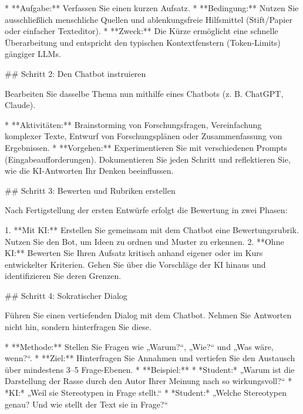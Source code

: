 \documentclass[
  ngerman,
  letterpaper,
  DIV=11]{scrreprt}
\newenvironment{Shaded}{\begin{snugshade}}{\end{snugshade}}
\newcommand{\FunctionTok}[1]{\textcolor[rgb]{0.28,0.35,0.67}{#1}}
\newcommand{\NormalTok}[1]{\textcolor[rgb]{0.00,0.23,0.31}{#1}}
\newcommand{\SpecialStringTok}[1]{\textcolor[rgb]{0.13,0.47,0.30}{#1}}
\begin{document}
\begin{tcolorbox}
\begin{Shaded}
\begin{Highlighting}[]
\SpecialStringTok{* }\NormalTok{**Aufgabe:** Verfassen Sie einen kurzen Aufsatz.}
\SpecialStringTok{* }\NormalTok{**Bedingung:** Nutzen Sie ausschließlich menschliche Quellen und ablenkungsfreie Hilfsmittel (Stift/Papier oder einfacher Texteditor).}
\SpecialStringTok{* }\NormalTok{**Zweck:** Die Kürze ermöglicht eine schnelle Überarbeitung und entspricht den typischen Kontextfenstern (Token{-}Limits) gängiger LLMs.}

\FunctionTok{\#\# Schritt 2: Den Chatbot instruieren}

\NormalTok{Bearbeiten Sie dasselbe Thema nun mithilfe eines Chatbots (z. B. ChatGPT, Claude).}

\SpecialStringTok{* }\NormalTok{**Aktivitäten:** Brainstorming von Forschungsfragen, Vereinfachung komplexer Texte, Entwurf von Forschungsplänen oder Zusammenfassung von Ergebnissen.}
\SpecialStringTok{* }\NormalTok{**Vorgehen:** Experimentieren Sie mit verschiedenen Prompts (Eingabeaufforderungen). Dokumentieren Sie jeden Schritt und reflektieren Sie, wie die KI{-}Antworten Ihr Denken beeinflussen.}

\FunctionTok{\#\# Schritt 3: Bewerten und Rubriken erstellen}

\NormalTok{Nach Fertigstellung der ersten Entwürfe erfolgt die Bewertung in zwei Phasen:}

\SpecialStringTok{1.  }\NormalTok{**Mit KI:** Erstellen Sie gemeinsam mit dem Chatbot eine Bewertungsrubrik. Nutzen Sie den Bot, um Ideen zu ordnen und Muster zu erkennen.}
\SpecialStringTok{2.  }\NormalTok{**Ohne KI:** Bewerten Sie Ihren Aufsatz kritisch anhand eigener oder im Kurs entwickelter Kriterien. Gehen Sie über die Vorschläge der KI hinaus und identifizieren Sie deren Grenzen.}

\FunctionTok{\#\# Schritt 4: Sokratischer Dialog}

\NormalTok{Führen Sie einen vertiefenden Dialog mit dem Chatbot. Nehmen Sie Antworten nicht hin, sondern hinterfragen Sie diese.}

\SpecialStringTok{* }\NormalTok{**Methode:** Stellen Sie Fragen wie „Warum?“, „Wie?“ und „Was wäre, wenn?“.}
\SpecialStringTok{* }\NormalTok{**Ziel:** Hinterfragen Sie Annahmen und vertiefen Sie den Austausch über mindestens 3–5 Frage{-}Ebenen.}
\SpecialStringTok{* }\NormalTok{**Beispiel:**}
\SpecialStringTok{    * }\NormalTok{*Student:* „Warum ist die Darstellung der Rasse durch den Autor Ihrer Meinung nach so wirkungsvoll?“}
\SpecialStringTok{    * }\NormalTok{*KI:* „Weil sie Stereotypen in Frage stellt.“}
\SpecialStringTok{    * }\NormalTok{*Student:* „Welche Stereotypen genau? Und wie stellt der Text sie in Frage?“}


\end{Highlighting}
\end{Shaded}
\end{tcolorbox}
\end{document}
